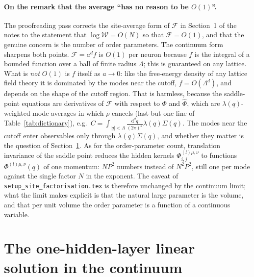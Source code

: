 \documentclass[11pt,a4paper]{article}
\newcommand{\W}{\mathcal W}
\newcommand{\F}{\mathcal F}
\newcommand{\dd}{\mathrm d}
\newcommand{\Lam}{\Lambda}
\begin{document}
\paragraph{On the remark that the average ``has no reason to be $O(1)$''.}
The proofreading pass corrects the site-average form of $\F$ in Section~1 of the notes to the statement that $\log\W = O(N)$ so that $\F = O(1)$, and that the genuine concern is the number of order parameters. The continuum form sharpens both points. $\F = a^d f$ is $O(1)$ per neuron because $f$ is the integral of a bounded function over a ball of finite radius $\Lam$; this is guaranteed on any lattice. What is \emph{not} $O(1)$ is $f$ itself as $a\to0$: like the free-energy density of any lattice field theory it is dominated by the modes near the cutoff, $f = O(\Lam^d)$, and depends on the shape of the cutoff region. That is harmless, because the saddle-point equations are derivatives of $\F$ with respect to $\Phi$ and $\hat\Phi$, which are $\lambda(q)$-weighted mode averages in which $\rho$ cancels (last-but-one line of Table~\ref{tab:dictionary}), e.g.\ $C = \int_{|q|<\Lam}\frac{\dd^dq}{(2\pi)^d}\lambda(q)\Sigma(q)$. The modes near the cutoff enter observables only through $\lambda(q)\Sigma(q)$, and whether they matter is the question of Section~\ref{sec:linear}. As for the order-parameter count, translation invariance of the saddle point reduces the hidden kernels $\Phi^{(l)\mu,\nu}_{i,j}$ to functions $\Phi^{(l)\mu,\nu}(q)$ of one momentum: $NP^2$ numbers instead of $N^2P^2$, still one per mode against the single factor $N$ in the exponent. The caveat of \texttt{setup\_site\_factorisation.tex} is therefore unchanged by the continuum limit; what the limit makes explicit is that the natural large parameter is the volume, and that per unit volume the order parameter is a function of a continuous variable.

\section{The one-hidden-layer linear solution in the continuum}
\label{sec:linear}
\end{document}
